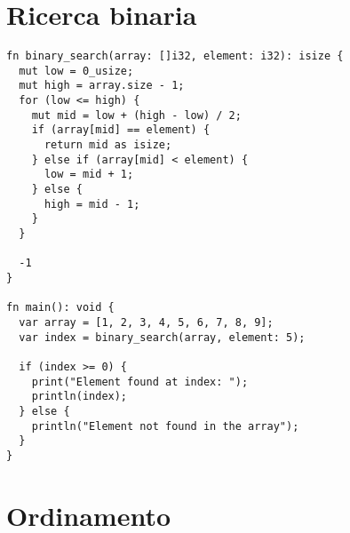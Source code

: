 \section*{Ricerca binaria}

\hfill

\begin{mdframed}[style=examplestyle]
	\begin{verbatim}
fn binary_search(array: []i32, element: i32): isize {
  mut low = 0_usize;
  mut high = array.size - 1;
  for (low <= high) {
    mut mid = low + (high - low) / 2;
    if (array[mid] == element) {
      return mid as isize;
    } else if (array[mid] < element) {
      low = mid + 1;
    } else {
      high = mid - 1;
    }
  }

  -1
}

fn main(): void {
  var array = [1, 2, 3, 4, 5, 6, 7, 8, 9];
  var index = binary_search(array, element: 5);

  if (index >= 0) {
    print("Element found at index: ");
    println(index);
  } else {
    println("Element not found in the array");
  }
}
	\end{verbatim}
\end{mdframed}

\section*{Ordinamento}

\hfill

